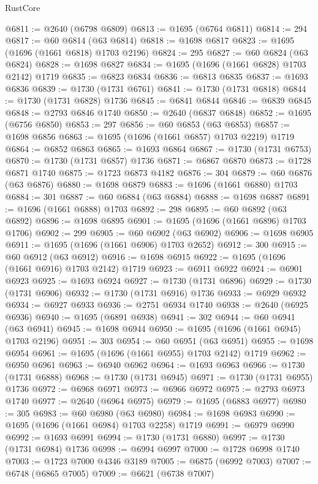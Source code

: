 \begin{lexlean}{RustCore}
\begin{coremodule}
@6811 := @2640 (@6798 @6809)
@6813 := @1695 (@6764 @6811)
@6814 := 294
@6817 := @60 @6814 (@63 @6814)
@6818 := @1698 @6817
@6823 := @1695 (@1696 (@1661 @6818) @1703 @2196)
@6824 := 295
@6827 := @60 @6824 (@63 @6824)
@6828 := @1698 @6827
@6834 := @1695 (@1696 (@1661 @6828) @1703 @2142) @1719
@6835 := @6823 @6834
@6836 := @6813 @6835
@6837 := @1693 @6836
@6839 := @1730 (@1731 @6761)
@6841 := @1730 (@1731 @6818)
@6844 := @1730 (@1731 @6828) @1736
@6845 := @6841 @6844
@6846 := @6839 @6845
@6848 := @2793 @6846 @1740
@6850 := @2640 (@6837 @6848)
@6852 := @1695 (@6756 @6850)
@6853 := 297
@6856 := @60 @6853 (@63 @6853)
@6857 := @1698 @6856
@6863 := @1695 (@1696 (@1661 @6857) @1703 @2219) @1719
@6864 := @6852 @6863
@6865 := @1693 @6864
@6867 := @1730 (@1731 @6753)
@6870 := @1730 (@1731 @6857) @1736
@6871 := @6867 @6870
@6873 := @1728 @6871 @1740
@6875 := @1723 @6873 @4182
@6876 := 304
@6879 := @60 @6876 (@63 @6876)
@6880 := @1698 @6879
@6883 := @1696 (@1661 @6880) @1703
@6884 := 301
@6887 := @60 @6884 (@63 @6884)
@6888 := @1698 @6887
@6891 := @1696 (@1661 @6888) @1703
@6892 := 298
@6895 := @60 @6892 (@63 @6892)
@6896 := @1698 @6895
@6901 := @1695 (@1696 (@1661 @6896) @1703 @1706)
@6902 := 299
@6905 := @60 @6902 (@63 @6902)
@6906 := @1698 @6905
@6911 := @1695 (@1696 (@1661 @6906) @1703 @2652)
@6912 := 300
@6915 := @60 @6912 (@63 @6912)
@6916 := @1698 @6915
@6922 := @1695 (@1696 (@1661 @6916) @1703 @2142) @1719
@6923 := @6911 @6922
@6924 := @6901 @6923
@6925 := @1693 @6924
@6927 := @1730 (@1731 @6896)
@6929 := @1730 (@1731 @6906)
@6932 := @1730 (@1731 @6916) @1736
@6933 := @6929 @6932
@6934 := @6927 @6933
@6936 := @2751 @6934 @1740
@6938 := @2640 (@6925 @6936)
@6940 := @1695 (@6891 @6938)
@6941 := 302
@6944 := @60 @6941 (@63 @6941)
@6945 := @1698 @6944
@6950 := @1695 (@1696 (@1661 @6945) @1703 @2196)
@6951 := 303
@6954 := @60 @6951 (@63 @6951)
@6955 := @1698 @6954
@6961 := @1695 (@1696 (@1661 @6955) @1703 @2142) @1719
@6962 := @6950 @6961
@6963 := @6940 @6962
@6964 := @1693 @6963
@6966 := @1730 (@1731 @6888)
@6968 := @1730 (@1731 @6945)
@6971 := @1730 (@1731 @6955) @1736
@6972 := @6968 @6971
@6973 := @6966 @6972
@6975 := @2793 @6973 @1740
@6977 := @2640 (@6964 @6975)
@6979 := @1695 (@6883 @6977)
@6980 := 305
@6983 := @60 @6980 (@63 @6980)
@6984 := @1698 @6983
@6990 := @1695 (@1696 (@1661 @6984) @1703 @2258) @1719
@6991 := @6979 @6990
@6992 := @1693 @6991
@6994 := @1730 (@1731 @6880)
@6997 := @1730 (@1731 @6984) @1736
@6998 := @6994 @6997
@7000 := @1728 @6998 @1740
@7003 := @1723 @7000 @4346 @3189
@7005 := @6875 (@6992 @7003)
@7007 := @6748 (@6865 @7005)
@7009 := @6621 (@6738 @7007)

\end{coremodule}
\end{lexlean}
